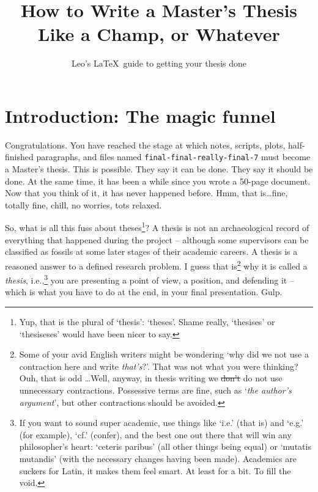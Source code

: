 \documentclass[masters,en,listoffigures,listoftables,acronyms]{NMBU}
\title{How to Write a Master's Thesis Like a Champ, or Whatever}
\author{Leo's \LaTeX~guide to getting your thesis done}
\begin{document}
\startthesis

\section{Introduction: The magic funnel}\label{sec:introduction}

Congratulations. You have reached the stage at which notes, scripts, plots, half-finished paragraphs, and files named \texttt{final-final-really-final-7} must become a Master's thesis.
This is possible.
They say it can be done.
They say it should be done.
At the same time, it has been a while since you wrote a 50-page document.
Now that you think of it, it has never happened before.
Hmm, that is\dots fine, totally fine, chill, no worries, tots relaxed.

So, what is all this fuss about theses\footnote{Yup, that is the plural of `thesis': `theses'. Shame really, `thesises' or `thesiseses' would have been nicer to say.}? A thesis is not an archaeological record of everything that happened during the project -- although some supervisors can be classified as fossils at some later stages of their academic careers.
A thesis is a reasoned answer to a defined research problem.
I guess that is\footnote{Some of your avid English writers might be wondering `why did we not use a contraction here and write \emph{that's}?'. That was not what you were thinking? Ouh, that is odd \dots Well, anyway, in thesis writing we \st{don't} do not use unnecessary contractions. Possessive terms are fine, such as `\emph{the author's argument}', but other contractions should be avoided.} why it is called a \emph{thesis}, i.e.,\footnote{If you want to sound super academic, use things like `i.e.' (that is) and `e.g.' (for example), `cf.' (confer), and the best one out there that will win any philosopher's heart: `ceteris paribus' (all other things being equal) or `mutatis mutandis' (with the necessary changes having been made). Academics are suckers for Latin, it makes them feel smart. At least for a bit. To fill the void.} you are presenting a point of view, a position, and defending it -- which is what you have to do at the end, in your final presentation. Gulp.
\end{document}
